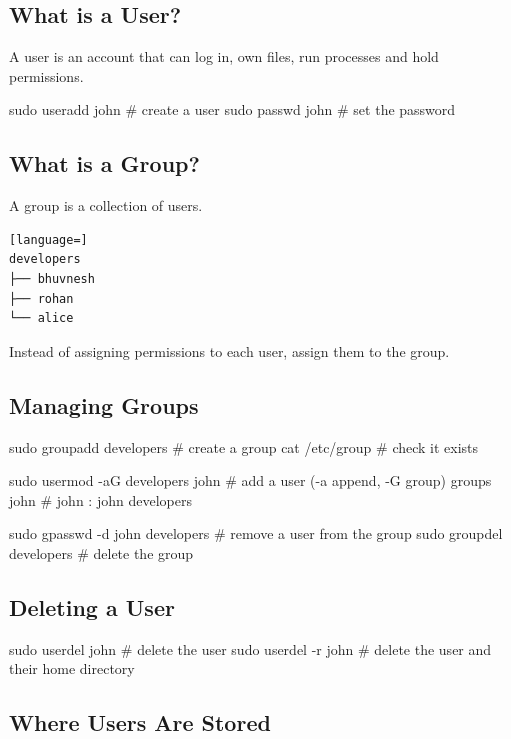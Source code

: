 \documentclass[11pt,a4paper]{article}
\begin{document}
\subsection{What is a User?}

A user is an account that can log in, own files, run processes and hold permissions.

\begin{sh}
sudo useradd john    # create a user
sudo passwd john     # set the password
\end{sh}

\subsection{What is a Group?}

A group is a collection of users.

\begin{lstlisting}[language=]
developers
├── bhuvnesh
├── rohan
└── alice
\end{lstlisting}

Instead of assigning permissions to each user, assign them to the group.

\subsection{Managing Groups}

\begin{sh}
sudo groupadd developers          # create a group
cat /etc/group                    # check it exists

sudo usermod -aG developers john  # add a user (-a append, -G group)
groups john
# john : john developers

sudo gpasswd -d john developers   # remove a user from the group
sudo groupdel developers          # delete the group
\end{sh}

\subsection{Deleting a User}

\begin{sh}
sudo userdel john      # delete the user
sudo userdel -r john   # delete the user and their home directory
\end{sh}

\subsection{Where Users Are Stored}
\end{document}
